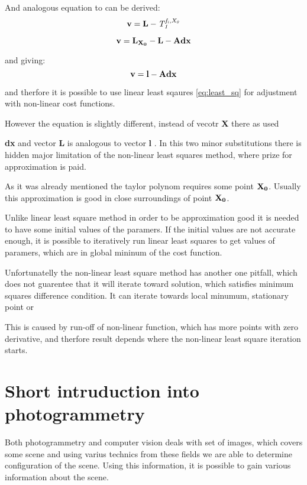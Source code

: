 \documentclass[a4paper,12pt]{report}
\newcommand{\ematr}[1]{
{\bf #1}
}
\newcommand{\evect}[1]{
{\bf #1}
}
\newcommand{\efunc}[1]{
{\it #1}
}
\begin{document}
And analogous equation to \label{eq:least_v} can be derived:
\begin{equation}
\evect{v} = \evect{L} - \efunc{T^{f_{i}, X_{0}}_{1}}
\end{equation} 

\begin{equation}
\evect{v} =  \evect{L_{X_{0}}} - \evect{L} - \ematr{A}\evect{dx}
\end{equation} 

and giving:
\begin{equation}
\evect{v} = \evect{l} - \ematr{A}\evect{dx}
\end{equation} 



and therfore it is possible to use linear least sqaures \eqref{eq:least_sq} for adjustment 
with non-linear cost functions.

However the equation is slightly different, instead of vecotr \evect{X} there as used 
\evect{dx} and vector  \evect{L} is analogous to vector \evect{l}. In this two minor 
substitutions there is hidden major limitation of the non-linear least squares method, 
where prize for approximation is paid. 

As it was already mentioned the taylor polynom requires some point $\evect{X_{0}}$.
Usually this approximation is good in close surroundings of point $\evect{X_{0}}$.

Unlike linear least square method in order to be approximation good it is needed to 
have some initial values of the paramers. If the initial values are not accurate 
enough, it is possible to iteratively run linear least squares to get values 
of paramers, which are in global mininum of the cost function. 

Unfortunatelly the non-linear least square method has another one pitfall, which 
does not guarentee that it will iterate toward solution,
which satisfies minimum squares difference condition. It can iterate towards
local minumum, stationary point or 

This is caused by run-off of non-linear function, which has more points with zero derivative,
and therfore result depends where the non-linear least square iteration starts. 

\section{Short intruduction into photogrammetry}

Both photogrammetry and computer vision deals with set of images, which covers some scene 
and using varius technics from these fields we are able to determine configuration of the scene. 
Using this information, it is possible to gain various information about the scene. 
\end{document}
